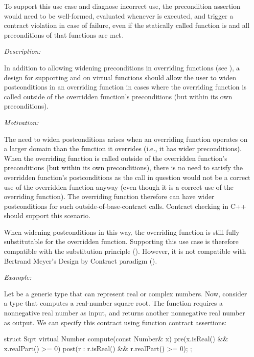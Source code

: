 To support this use case and diagnose incorrect use, the precondition assertion \mbox{} would need to be well-formed, evaluated whenever  is executed, and trigger a contract violation in case of failure, even if the statically called function is  and all preconditions of that functions are met.



\emph{Description:}

In addition to allowing widening preconditions in overriding functions (see ), a design for supporting  and  on virtual functions should allow the user to widen postconditions in an overriding function in cases where the overriding function is called outside of the overridden function's preconditions (but within its own preconditions).

\emph{Motivation:}

The need to widen postconditions arises when an overriding function operates on a larger domain than the function it overrides (i.e., it has wider preconditions). When the overriding function is called outside of the overridden function's preconditions (but within its own preconditions), there is no need to satisfy the overridden function's postconditions as the call in question would not be a correct use of the overridden function anyway (even though it is a correct use of the overriding function). The overriding function therefore can have wider postconditions for such outside-of-base-contract calls. Contract checking in C++ should support this scenario.

When widening postconditions in this way, the overriding function is still fully substitutable for the overridden function. Supporting this use case is therefore compatible with the substitution principle (). However, it is not  compatible with Bertrand Meyer's Design by Contract paradigm ().

\emph{Example:}

Let  be a generic type that can represent real or complex numbers. Now, consider a type  that computes a real-number square root. The function  requires a nonnegative real number as input, and returns another nonnegative real number as output. We can specify this contract using function contract assertions:

\begin{codeblock}
struct Sqrt {
  virtual Number compute(const Number& x)
    pre(x.isReal() && x.realPart() >= 0)
    post(r : r.isReal() && r.realPart() >= 0);
};
\end{codeblock}


